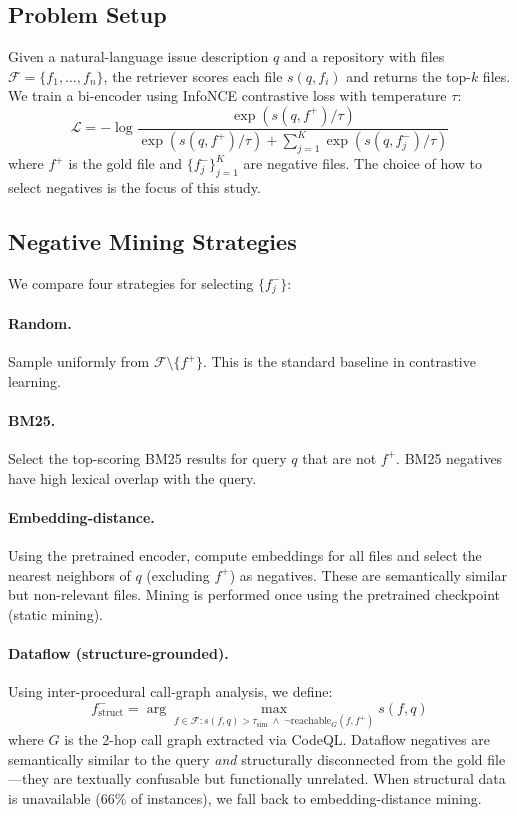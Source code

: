 \documentclass[11pt]{article}
\begin{document}
\subsection{Problem Setup}

Given a natural-language issue description $q$ and a repository with files $\mathcal{F} = \{f_1, \ldots, f_n\}$, the retriever scores each file $s(q, f_i)$ and returns the top-$k$ files.
We train a bi-encoder using InfoNCE contrastive loss with temperature $\tau$:
\begin{equation}
\mathcal{L} = -\log \frac{\exp(s(q, f^+)/\tau)}{\exp(s(q, f^+)/\tau) + \sum_{j=1}^{K} \exp(s(q, f_j^-)/\tau)}
\end{equation}
where $f^+$ is the gold file and $\{f_j^-\}_{j=1}^K$ are negative files.
The choice of how to select negatives is the focus of this study.

\subsection{Negative Mining Strategies}

We compare four strategies for selecting $\{f_j^-\}$:

\paragraph{Random.}
Sample uniformly from $\mathcal{F} \setminus \{f^+\}$.
This is the standard baseline in contrastive learning.

\paragraph{BM25.}
Select the top-scoring BM25 results for query $q$ that are not $f^+$.
BM25 negatives have high lexical overlap with the query.

\paragraph{Embedding-distance.}
Using the pretrained encoder, compute embeddings for all files and select the nearest neighbors of $q$ (excluding $f^+$) as negatives.
These are semantically similar but non-relevant files.
Mining is performed once using the pretrained checkpoint (static mining).

\paragraph{Dataflow (structure-grounded).}
Using inter-procedural call-graph analysis, we define:
\begin{equation}
f^-_{\text{struct}} = \arg\max_{f \in \mathcal{F}: s(f,q) > \tau_{\text{sim}} \;\wedge\; \neg\text{reachable}_G(f, f^+)} s(f, q)
\end{equation}
where $G$ is the 2-hop call graph extracted via CodeQL.
Dataflow negatives are semantically similar to the query \emph{and} structurally disconnected from the gold file---they are textually confusable but functionally unrelated.
When structural data is unavailable (66\% of instances), we fall back to embedding-distance mining.
\end{document}
